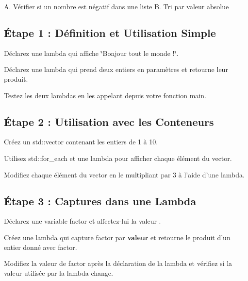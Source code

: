 A. Vérifier si un nombre est négatif dans une liste B. Tri par valeur absolue

\subsection*{Étape 1 \+: Définition et Utilisation Simple}


\begin{DoxyEnumerate}
\item Déclarez une lambda qui affiche {\ttfamily \char`\"{}\+Bonjour tout le monde !\char`\"{}}.
\item Déclarez une lambda qui prend deux entiers en paramètres et retourne leur produit.
\item Testez les deux lambdas en les appelant depuis votre fonction {\ttfamily main}.
\end{DoxyEnumerate}

\subsection*{Étape 2 \+: Utilisation avec les Conteneurs}


\begin{DoxyEnumerate}
\item Créez un {\ttfamily std\+::vector} contenant les entiers de 1 à 10.
\item Utilisez {\ttfamily std\+::for\+\_\+each} et une lambda pour afficher chaque élément du vector.
\item Modifiez chaque élément du vector en le multipliant par 3 à l’aide d’une lambda.
\end{DoxyEnumerate}

\subsection*{Étape 3 \+: Captures dans une Lambda}


\begin{DoxyEnumerate}
\item Déclarez une variable {\ttfamily factor} et affectez-\/lui la valeur {}.
\item Créez une lambda qui capture {\ttfamily factor} par {\bfseries valeur} et retourne le produit d’un entier donné avec {\ttfamily factor}.
\item Modifiez la valeur de {\ttfamily factor} après la déclaration de la lambda et vérifiez si la valeur utilisée par la lambda change.
\end{DoxyEnumerate}

